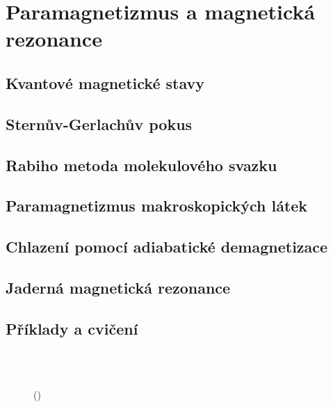 \setchaptertoc
\chapter{Paramagnetizmus a magnetická rezonance}\label{fyz:IIchapXXXV}

  \section{Kvantové magnetické stavy}\label{fyz:IIchapXXXVsecI}
  \section{Sternův-Gerlachův pokus}\label{fyz:IIchapXXXVsecII}
  \section{Rabiho metoda molekulového svazku}\label{fyz:IIchapXXXVsecIII}
  \section{Paramagnetizmus makroskopických látek}\label{fyz:IIchapXXXVsecIV}
  \section{Chlazení pomocí adiabatické demagnetizace}\label{fyz:IIchapXXXVsecV}
  \section{Jaderná magnetická rezonance}\label{fyz:IIchapXXXVsecVI}
  \section{Příklady a cvičení}\label{fyz:IIchapXXXVsecVII}

    \begin{figure}[ht!] %
      \centering
                     \\
                     \\
      \caption{
               (\cite[s.~748]{Feynman02})}
      \label{fyz:fig0846}
    \end{figure}

